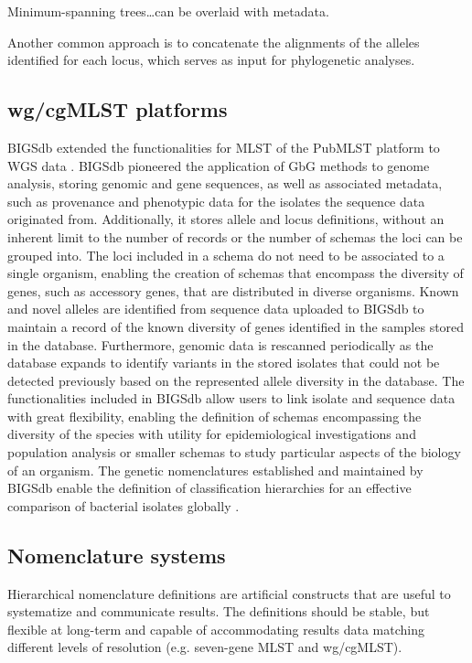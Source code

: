 Minimum-spanning trees…can be overlaid with metadata.

Another common approach is to concatenate the alignments of the alleles identified for each locus, which serves as input for phylogenetic analyses.

\subsection{wg/cgMLST platforms}

\ac{BIGSdb} extended the functionalities for \ac{MLST} of the PubMLST platform to \ac{WGS} data \cite{jolley_bigsdb_2010, jolley_open-access_2018}. \ac{BIGSdb} pioneered the application of \ac{GbG} methods to genome analysis, storing genomic and gene sequences, as well as associated metadata, such as provenance and phenotypic data for the isolates the sequence data originated from. Additionally, it stores allele and locus definitions, without an inherent limit to the number of records or the number of schemas the loci can be grouped into. The loci included in a schema do not need to be associated to a single organism, enabling the creation of schemas that encompass the diversity of genes, such as accessory genes, that are distributed in diverse organisms. Known and novel alleles are identified from sequence data uploaded to \ac{BIGSdb} to maintain a record of the known diversity of genes identified in the samples stored in the database. Furthermore, genomic data is rescanned periodically as the database expands to identify variants in the stored isolates that could not be detected previously based on the represented allele diversity in the database. The functionalities included in \ac{BIGSdb} allow users to link isolate and sequence data with great flexibility, enabling the definition of schemas encompassing the diversity of the species with utility for epidemiological investigations and population analysis or smaller schemas to study particular aspects of the biology of an organism. The genetic nomenclatures established and maintained by \ac{BIGSdb} enable the definition of classification hierarchies for an effective comparison of bacterial isolates globally \cite{jolley_open-access_2018}.

\subsection{Nomenclature systems}

Hierarchical nomenclature definitions are artificial constructs that are useful to systematize and communicate results. The definitions should be stable, but flexible at long-term and capable of accommodating results data matching different levels of resolution (e.g. seven-gene MLST and wg/cgMLST).

